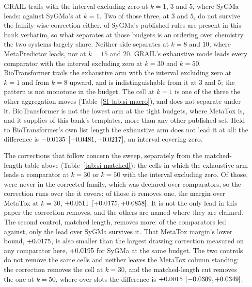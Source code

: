 GRAIL trails with the interval excluding zero at $k=1$, $3$ and $5$, where SyGMa leads:
\numSweepTrainedOne{} against SyGMa's \numSweepSygmaOne{} at $k=1$. Two of those three, at $3$ and $5$, do
not survive the family-wise correction either.  \numSygmaInside{} of SyGMa's
\numSygmaRules{} published rules are present in this bank verbatim, so what separates at those
budgets is an ordering over chemistry the two systems largely share. Neither side separates at $k=8$ and
$10$, where MetaPredictor leads, nor at $k=15$ and $20$. GRAIL's exhaustive mode leads every
comparator with the interval excluding zero at $k=30$ and $k=50$. BioTransformer trails the exhaustive
arm with the interval excluding zero at $k=1$ and from $k=8$ upward, and is indistinguishable from
it at $3$ and $5$; the pattern is not monotone in the budget. The
cell at $k=1$ is one of the three the other aggregation moves
(Table~\ref{SI-tab:si-macro}), and does not separate under it. BioTransformer is not
the lowest arm at the tight budgets, where MetaTox is, and it supplies
\numThirdpartyBiotransformerShipped{} of this bank's templates, more than any other published set. Held to BioTransformer's own list length the exhaustive arm does not lead it at all: the
difference is
$-0.0135$ $[-0.0481, +0.0217]$, an interval covering zero.

The corrections that follow concern the sweep, separately from
the matched-length table above (Table~\ref{tab:si-matched}): the \numSweepWideleadsWord{} cells in which the exhaustive arm leads a comparator
at $k=30$ or $k=50$ with the interval excluding zero. Of those, \numSweepWideleadsoutsideWord{} were
never in the corrected family, which was declared over \numSweepFamilycomparatorsWord{}
comparators, so the correction runs over the \numSweepWideleadsinfamilyWord{} it covers; of
those it removes one, the margin over MetaTox at $k=30$, $+0.0511$
$[+0.0175, +0.0858]$. It is not the only lead in this paper the
correction removes, and the others are named where they are claimed. The second control, matched length, removes
more: of the \numMatchedComparatorsWord{} comparators led against, only the lead over SyGMa
survives it.
That MetaTox margin's lower bound, $+0.0175$, is also smaller than the largest
drawing correction measured on any comparator here, $+0.0195$ for SyGMa at the same
budget. The two controls do not remove the
same cells and neither leaves the MetaTox column standing: the correction removes the cell at
$k=30$, and the matched-length cut removes the one at $k=50$, where over
\numMatchedBankmetatoxSlots{} slots the difference is $+0.0015$
$[-0.0309, +0.0349]$.


